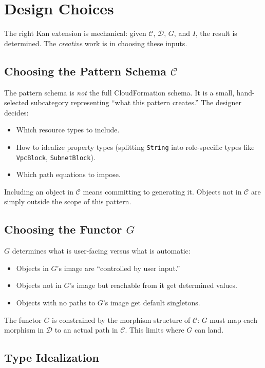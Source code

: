 \documentclass[11pt,a4paper]{article}
\theoremstyle{definition}
\theoremstyle{plain}
\begin{document}
\section{Design Choices}
\label{sec:design-choices}

The right Kan extension is mechanical: given $\mathcal{C}$, $\mathcal{D}$, $G$, and $I$, the result is determined. The \emph{creative} work is in choosing these inputs.

\subsection{Choosing the Pattern Schema $\mathcal{C}$}

The pattern schema is \emph{not} the full CloudFormation schema. It is a small, hand-selected subcategory representing ``what this pattern creates.'' The designer decides:
\begin{itemize}
  \item Which resource types to include.
  \item How to idealize property types (splitting \texttt{String} into role-specific types like \texttt{VpcBlock}, \texttt{SubnetBlock}).
  \item Which path equations to impose.
\end{itemize}

Including an object in $\mathcal{C}$ means committing to generating it. Objects not in $\mathcal{C}$ are simply outside the scope of this pattern.

\subsection{Choosing the Functor $G$}

$G$ determines what is user-facing versus what is automatic:
\begin{itemize}
  \item Objects in $G$'s image are ``controlled by user input.''
  \item Objects not in $G$'s image but reachable from it get determined values.
  \item Objects with no paths to $G$'s image get default singletons.
\end{itemize}

The functor $G$ is constrained by the morphism structure of $\mathcal{C}$: $G$ must map each morphism in $\mathcal{D}$ to an actual path in $\mathcal{C}$. This limits where $G$ can land.

\subsection{Type Idealization}
\end{document}
